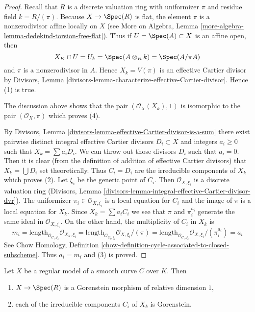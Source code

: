\begin{proof}
Recall that $R$ is a discrete valuation ring with uniformizer $\pi$
and residue field $k = R/(\pi)$. Because $X \to \Spec(R)$ is flat,
the element $\pi$ is a nonzerodivisor affine locally on $X$
(see More on Algebra, Lemma
\ref{more-algebra-lemma-dedekind-torsion-free-flat}). Thus
if $U = \Spec(A) \subset X$ is an affine open, then
$$
X_K \cap U = U_k = \Spec(A \otimes_R k) = \Spec(A/\pi A)
$$
and $\pi$ is a nonzerodivisor in $A$.
Hence $X_k = V(\pi)$ is an effective Cartier divisor by
Divisors, Lemma \ref{divisors-lemma-characterize-effective-Cartier-divisor}.
Hence (1) is true.

\medskip\noindent
The discussion above shows that the pair $(\mathcal{O}_X(X_k), 1)$
is isomorphic to the pair $(\mathcal{O}_X, \pi)$ which proves (4).

\medskip\noindent
By Divisors, Lemma \ref{divisors-lemma-effective-Cartier-divisor-is-a-sum}
there exist pairwise distinct integral effective Cartier divisors
$D_i \subset X$ and integers $a_i \geq 0$ such that $X_k = \sum a_i D_i$.
We can throw out those divisors $D_i$ such that $a_i = 0$. Then it is
clear (from the definition of addition of effective Cartier
divisors) that $X_k = \bigcup D_i$ set theoretically. Thus $C_i = D_i$
are the irreducible components of $X_k$ which proves (2).
Let $\xi_i$ be the generic point of $C_i$.
Then $\mathcal{O}_{X, \xi_i}$ is a discrete valuation ring
(Divisors, Lemma \ref{divisors-lemma-integral-effective-Cartier-divisor-dvr}).
The uniformizer $\pi_i \in \mathcal{O}_{X, \xi_i}$ is a local equation
for $C_i$ and the image of $\pi$ is a local equation for $X_k$.
Since $X_k = \sum a_i C_i$ we see that $\pi$ and $\pi_i^{a_i}$
generate the same ideal in $\mathcal{O}_{X, \xi_i}$.
On the other hand, the multiplicity of $C_i$ in $X_k$ is
$$
m_i = \text{length}_{\mathcal{O}_{C_i, \xi_i}} \mathcal{O}_{X_k, \xi_i} =
\text{length}_{\mathcal{O}_{C_i, \xi_i}} \mathcal{O}_{X, \xi_i}/(\pi) =
\text{length}_{\mathcal{O}_{C_i, \xi_i}} \mathcal{O}_{X, \xi_i}/(\pi_i^{a_i}) =
a_i
$$
See Chow Homology, Definition
\ref{chow-definition-cycle-associated-to-closed-subscheme}.
Thus $a_i = m_i$ and (3) is proved.
\end{proof}

\begin{lemma}
\label{lemma-gorenstein}
Let $X$ be a regular model of a smooth curve $C$ over $K$. Then
\begin{enumerate}
\item $X \to \Spec(R)$ is a Gorenstein morphism of relative dimension $1$,
\item each of the irreducible components $C_i$ of $X_k$ is Gorenstein.
\end{enumerate}
\end{lemma}

